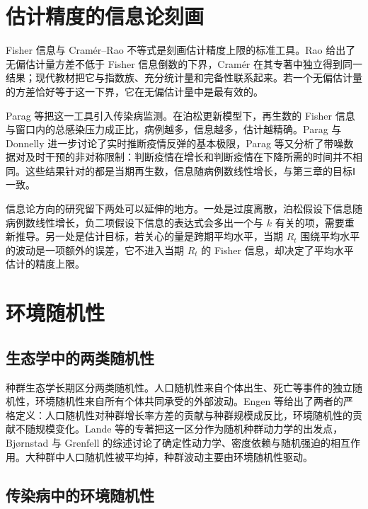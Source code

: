 \section{估计精度的信息论刻画}
\label{sec:lit-information}

Fisher 信息与 Cramér--Rao 不等式是刻画估计精度上限的标准工具。Rao 给出了无偏估计量方差不低于 Fisher 信息倒数的下界\citep{rao1945information}，Cramér 在其专著中独立得到同一结果\citep{cramer1946mathematical}；现代教材把它与指数族、充分统计量和完备性联系起来\citep{casella2002statistical, lehmann1998point}。若一个无偏估计量的方差恰好等于这一下界，它在无偏估计量中是最有效的。

Parag 等把这一工具引入传染病监测。在泊松更新模型下，再生数的 Fisher 信息与窗口内的总感染压力成正比，病例越多，信息越多，估计越精确\citep{parag2022quantifying}。Parag 与 Donnelly 进一步讨论了实时推断疫情反弹的基本极限\citep{parag2022fundamental}，Parag 等又分析了带噪数据对及时干预的非对称限制：判断疫情在增长和判断疫情在下降所需的时间并不相同\citep{parag2025asymmetric}。这些结果针对的都是当期再生数，信息随病例数线性增长，与第三章的目标Ⅰ一致。

信息论方向的研究留下两处可以延伸的地方。一处是过度离散，泊松假设下信息随病例数线性增长，负二项假设下信息的表达式会多出一个与 $k$ 有关的项，需要重新推导。另一处是估计目标，若关心的量是跨期平均水平，当期 $R_t$ 围绕平均水平的波动是一项额外的误差，它不进入当期 $R_t$ 的 Fisher 信息，却决定了平均水平估计的精度上限。

\section{环境随机性}
\label{sec:lit-environment}

\subsection{生态学中的两类随机性}

种群生态学长期区分两类随机性。人口随机性来自个体出生、死亡等事件的独立随机性，环境随机性来自所有个体共同承受的外部波动。Engen 等给出了两者的严格定义：人口随机性对种群增长率方差的贡献与种群规模成反比，环境随机性的贡献不随规模变化\citep{engen1998demographic}。Lande 等的专著把这一区分作为随机种群动力学的出发点\citep{lande2003stochastic}，Bj{\o}rnstad 与 Grenfell 的综述讨论了确定性动力学、密度依赖与随机强迫的相互作用\citep{bjornstad2001noisy}。大种群中人口随机性被平均掉，种群波动主要由环境随机性驱动。

\subsection{传染病中的环境随机性}


